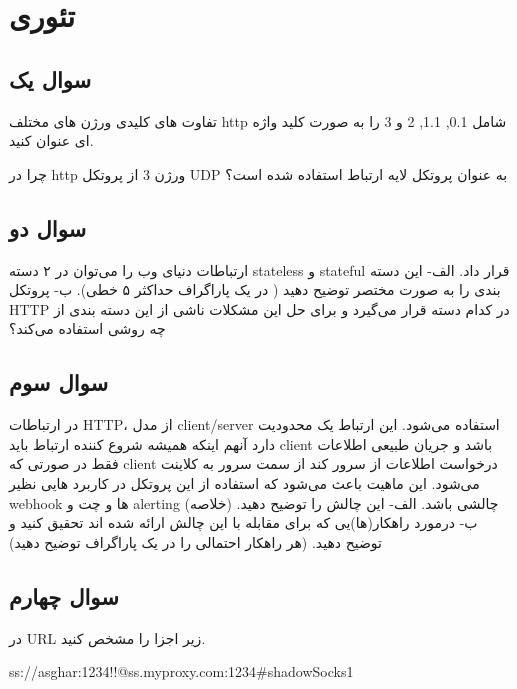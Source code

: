 \documentclass{../assignment}
\title{\lr{HTTP}}
\begin{document}
\maketitle

\tableofcontents
\makefooter
\newpage

\raggedleft
\section{تئوری}

\subsection{سوال یک}
تفاوت های کلیدی ورژن های مختلف http شامل 0.1, 1.1, 2 و 3 را به صورت کلید واژه ای عنوان کنید.

چرا در http ورژن 3 از پروتکل UDP به عنوان پروتکل لایه ارتباط استفاده شده است؟
\subsection{سوال دو}
ارتباطات دنیای وب را می‌توان در ۲ دسته stateless و stateful قرار داد.
\linebreak
الف- این دسته بندی را به صورت مختصر توضیح دهید ( در یک پاراگراف حداکثر ۵ خطی).
\linebreak
ب- پروتکل HTTP در کدام دسته قرار می‌گیرد و برای حل این مشکلات ناشی از این دسته بندی از چه روشی استفاده می‌کند؟

\subsection{سوال سوم}
در ارتباطات HTTP، از مدل client/server استفاده می‌شود. این ارتباط یک محدودیت دارد آنهم اینکه همیشه شروع کننده ارتباط باید client باشد و جریان طبیعی اطلاعات فقط در صورتی که client درخواست اطلاعات از سرور کند از سمت سرور به کلاینت می‌شود. این ماهیت باعث می‌شود که استفاده از این پروتکل در کاربرد هایی نظیر webhook ها و چت و alerting چالشی باشد. 
\linebreak
الف- این چالش را توضیح دهید. (خلاصه)
\linebreak
ب- درمورد راهکار(ها)یی که برای مقابله با این چالش ارائه شده اند تحقیق کنید و توضیح دهید. (هر راهکار احتمالی را در یک پاراگراف توضیح دهید)
\subsection{سوال چهارم}
در URL زیر اجزا را مشخص کنید.

\hfill
ss://asghar:1234!!@ss.myproxy.com:1234\#shadowSocks1
\end{document}

